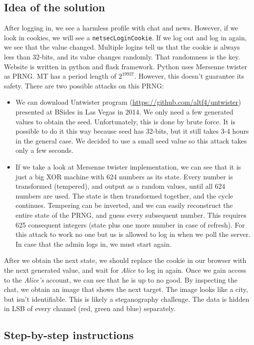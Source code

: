 \documentclass[11pt]{article}
\begin{document}
\subsection{Idea of the solution}
After logging in, we see a harmless profile with chat and news. However, if we look in cookies, we will see a \texttt{netsecLoginCookie}. If we log out and log in again, we see that the value changed. Multiple logins tell us that the cookie is always less than 32-bits, and its value changes randomly. That randomness is the key. Website is written in python and flask framework. Python uses Mersenne twister as PRNG. MT has a period length of $2^{19937}$. However, this doesn't guarantee its safety. There are two possible attacks on this PRNG:
\begin{itemize}
\item We can download Untwister program (\url{https://github.com/altf4/untwister}) presented at BSides in Las Vegas in 2014. We only need a few generated values to obtain the seed. Unfortunately, this is done by brute force. It is possible to do it this way because seed has 32-bits, but it still takes 3-4 hours in the general case. We decided to use a small seed value so this attack takes only a few seconds.
\item  If we take a look at Mersenne twister implementation, we can see that it is just a big XOR machine with 624 numbers as its state. Every number is transformed (tempered), and output as a random values, until all 624 numbers are used. The state is then transformed together, and the cycle continues. Tempering can be inverted, and we can easily reconstruct the entire state of the PRNG, and guess every subsequent number. This requires 625 consequent integers (state plus one more number in case of refresh). For this attack to work no one but us is allowed to log in when we poll the server. In case that the admin logs in, we must start again.
\end{itemize}
After we obtain the next state, we should replace the cookie in our browser with the next generated value, and wait for \textit{Alice} to log in again. Once we gain access to the \textit{Alice's} account, we can see that he is up to no good. By inspecting the chat, we obtain an image that shows the next target. The image looks like a city, but isn't identifiable. This is likely a steganography challenge. The data is hidden in LSB of every channel (red, green and blue) separately.

\subsection{Step-by-step instructions}
\end{document}
